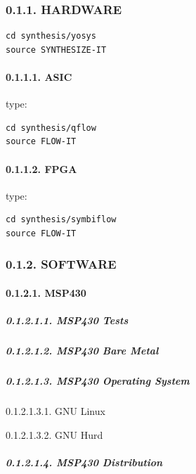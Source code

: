 \documentclass[
]{article}
\begin{document}
\hypertarget{hardware}{%
\subsubsection{0.1.1. HARDWARE}\label{hardware}}

\begin{verbatim}
cd synthesis/yosys
source SYNTHESIZE-IT
\end{verbatim}

\hypertarget{asic}{%
\paragraph{0.1.1.1. ASIC}\label{asic}}

type:

\begin{verbatim}
cd synthesis/qflow
source FLOW-IT
\end{verbatim}

\hypertarget{fpga}{%
\paragraph{0.1.1.2. FPGA}\label{fpga}}

type:

\begin{verbatim}
cd synthesis/symbiflow
source FLOW-IT
\end{verbatim}

\hypertarget{software}{%
\subsubsection{0.1.2. SOFTWARE}\label{software}}

\hypertarget{msp430}{%
\paragraph{0.1.2.1. MSP430}\label{msp430}}

\hypertarget{msp430-tests}{%
\subparagraph{0.1.2.1.1. MSP430 Tests}\label{msp430-tests}}

\hypertarget{msp430-bare-metal}{%
\subparagraph{0.1.2.1.2. MSP430 Bare Metal}\label{msp430-bare-metal}}

\hypertarget{msp430-operating-system}{%
\subparagraph{0.1.2.1.3. MSP430 Operating
System}\label{msp430-operating-system}}

0.1.2.1.3.1. GNU Linux

0.1.2.1.3.2. GNU Hurd

\hypertarget{msp430-distribution}{%
\subparagraph{0.1.2.1.4. MSP430
Distribution}\label{msp430-distribution}}
\end{document}
